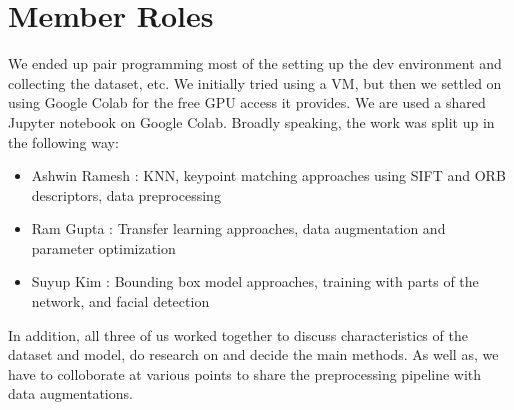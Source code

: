 \section{Member Roles}
We ended up pair programming most of the setting up the dev environment and collecting the dataset, etc. We initially tried using a VM, but then we settled on using Google Colab for the free GPU access it provides. We are used a shared Jupyter notebook on Google Colab. Broadly speaking, the work was split up in the following way: 
\begin{itemize}
    \item Ashwin Ramesh : KNN, keypoint matching approaches using SIFT and ORB descriptors, data preprocessing
    \item Ram Gupta : Transfer learning approaches, data augmentation and parameter optimization
    \item Suyup Kim : Bounding box model approaches, training with parts of the network, and facial detection
\end{itemize}

In addition, all three of us worked together to discuss characteristics of the dataset and model, do research on and decide the main methods. As well as, we have to colloborate at various points to share the preprocessing pipeline with data augmentations.